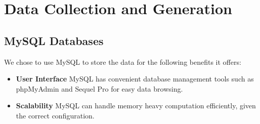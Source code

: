 \chapter{Data Collection and Generation}
\label{ch:data_generation}



\section{MySQL Databases}
\par We chose to use MySQL to store the data for the following benefits it offers:

\begin{itemize}
  \item \textbf{User Interface} MySQL has convenient database management tools such as phpMyAdmin\cite{phpmyadmin} and Sequel Pro\cite{sequel_pro} for easy data browsing.
  \item \textbf{Scalability} MySQL can handle memory heavy computation efficiently, given the correct configuration.
\end{itemize}



